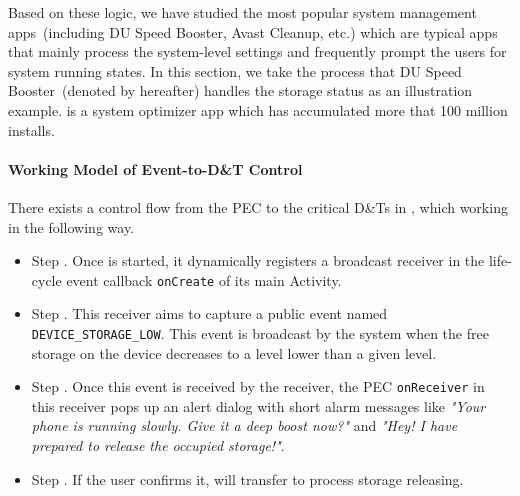 Based on these logic, we have studied the most popular
system management apps~(including \textsf{DU Speed Booster}, \textsf{Avast Cleanup}, etc.) which 
are typical apps that mainly process the system-level settings and frequently prompt the users for system running states. 
In this section, we take the process that \textsf{DU Speed Booster}~(denoted by \du hereafter) handles the storage status as an illustration example. 
\du is a system optimizer app which has accumulated more that 100 million installs. 


\paragraph{Working Model of Event-to-D\&T Control}
There exists a control flow from the PEC to the critical D\&Ts in \du, which working in the following way. 
\begin{itemize}
    \item Step . Once \du is started, it dynamically registers a broadcast receiver in the life-cycle event callback \texttt{onCreate} of its main Activity. 
    \item Step . This receiver aims to capture a public event named \texttt{DEVICE\_STORAGE\_LOW}. 
This event is broadcast by the system 
when the free storage on the device decreases to a level lower than a given level. 
    \item Step . 
Once this event is received by the receiver, the PEC \texttt{onReceiver} in this receiver pops up an alert dialog 
with short alarm messages like \emph{"Your phone is running slowly. Give it a deep boost now?"} and 
\emph{"Hey! I have prepared to release the occupied storage!"}.  
    \item Step . If the user confirms it, \du will transfer to process storage releasing. 
\end{itemize}




